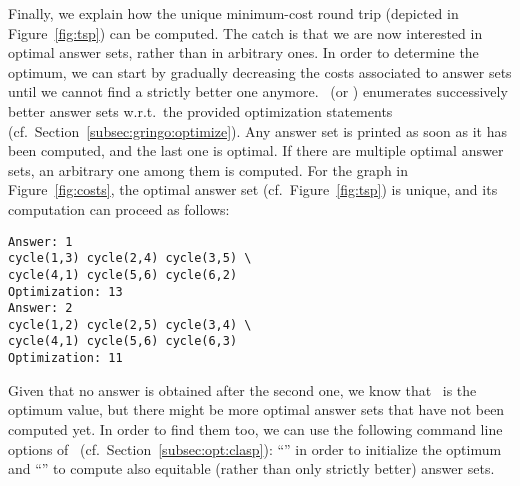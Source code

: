Finally, we explain how the unique minimum-cost round trip
(depicted in Figure~\ref{fig:tsp}) can be computed.
The catch is that we are now interested in optimal answer sets,
rather than in arbitrary ones.
In order to determine the optimum, we can start by gradually
decreasing the costs associated to answer sets
until we cannot find a strictly better one anymore.
\clasp\ (or \clingo) enumerates successively better answer sets
w.r.t.\ the provided optimization statements (cf.\ Section~\ref{subsec:gringo:optimize}).
Any answer set is printed as soon as it has been computed,
and the last one is optimal.
If there are multiple optimal answer sets, an arbitrary one among them is computed.
For the graph in Figure~\ref{fig:costs},
the optimal answer set (cf.\ Figure~\ref{fig:tsp}) is unique,
and its computation can proceed as follows:%
%
\begin{lstlisting}[numbers=none]
Answer: 1
cycle(1,3) cycle(2,4) cycle(3,5) \
cycle(4,1) cycle(5,6) cycle(6,2)
Optimization: 13
Answer: 2
cycle(1,2) cycle(2,5) cycle(3,4) \
cycle(4,1) cycle(5,6) cycle(6,3)
Optimization: 11
\end{lstlisting}
%
Given that no answer is obtained after the second one,
we know that~\code{11} is the optimum value,
but there might be more optimal answer sets that have not been computed yet.
In order to find them too, we can use the following command line options
of \clasp\ (cf.\ Section~\ref{subsec:opt:clasp}):
``\code{--opt-value=11}'' in order to initialize the optimum and
``\code{--opt-all}'' to compute also equitable
(rather than only strictly better) answer sets.
